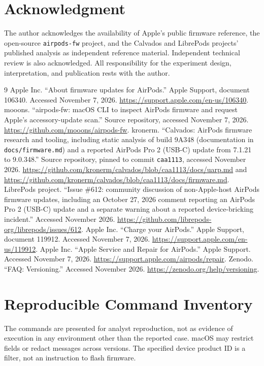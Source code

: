 \documentclass[11pt,letterpaper]{article}
\begin{document}
\section*{Acknowledgment}
The author acknowledges the availability of Apple's public firmware reference, the open-source \texttt{airpods-fw} project, and the Calvados and LibrePods projects' published analysis as independent reference material. Independent technical review is also acknowledged. All responsibility for the experiment design, interpretation, and publication rests with the author.

\begin{thebibliography}{9}
 Apple Inc. ``About firmware updates for AirPods.'' Apple Support, document 106340. Accessed November 7, 2026. \url{https://support.apple.com/en-us/106340}.
 mooons. ``airpods-fw: macOS CLI to inspect AirPods firmware and request Apple's accessory-update scan.'' Source repository, accessed November 7, 2026. \url{https://github.com/mooons/airpods-fw}.
 kronerm. ``Calvados: AirPods firmware research and tooling, including static analysis of build 9A348 (documentation in \texttt{docs/firmware.md}) and a reported AirPods Pro 2 (USB-C) update from 7.1.21 to 9.0.348.'' Source repository, pinned to commit \texttt{caa1113}, accessed November 2026. \url{https://github.com/kronerm/calvados/blob/caa1113/docs/uarp.md} and \url{https://github.com/kronerm/calvados/blob/caa1113/docs/firmware.md}.
 LibrePods project. ``Issue \#612: community discussion of non-Apple-host AirPods firmware updates, including an October 27, 2026 comment reporting an AirPods Pro 2 (USB-C) update and a separate warning about a reported device-bricking incident.'' Accessed November 2026. \url{https://github.com/librepods-org/librepods/issues/612}.
 Apple Inc. ``Charge your AirPods.'' Apple Support, document 119912. Accessed November 7, 2026. \url{https://support.apple.com/en-us/119912}.
 Apple Inc. ``Apple Service and Repair for AirPods.'' Apple Support. Accessed November 7, 2026. \url{https://support.apple.com/airpods/repair}.
 Zenodo. ``FAQ: Versioning.'' Accessed November 2026. \url{https://zenodo.org/help/versioning}.
\end{thebibliography}

\appendix
\section{Reproducible Command Inventory}\label{app:commands}
The commands are presented for analyst reproduction, not as evidence of execution in any environment other than the reported case. macOS may restrict fields or redact messages across versions. The specified device product ID is a filter, not an instruction to flash firmware.
\end{document}
